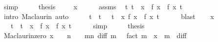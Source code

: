 \begin{isabellebody}
\ simp\isanewline
\ \ \isamarkupfalse%
\ \isamarkupfalse%
\ {\isacharquery}{\kern0pt}thesis\ \isacommand{{\isachardot}{\kern0pt}{\isachardot}{\kern0pt}}\isamarkupfalse%
\isanewline
{}\isamarkupfalse%
\isanewline
\ \ \isamarkupfalse%
\ {\isachardoublequoteopen}x\ {\isachargreater}{\kern0pt}\ {}{\isachardoublequoteclose}\isanewline
\ \ \isamarkupfalse%
\ assms\ \isamarkupfalse%
\ {\isachardoublequoteopen}{\isasymexists}t{\isachargreater}{\kern0pt}{}{\isachardot}{\kern0pt}\ t\ {\isacharless}{\kern0pt}\ x\ {\isasymand}\ f\ x\ {\isacharequal}{\kern0pt}\ {\isacharquery}{\kern0pt}f\ x\ t{\isachardoublequoteclose}\isanewline
\ \ \ \ \isamarkupfalse%
\ {\isacharparenleft}{\kern0pt}intro\ Maclaurin{\isacharparenright}{\kern0pt}\ auto\isanewline
\ \ \isamarkupfalse%
\ \isamarkupfalse%
\ t\ \ {\isachardoublequoteopen}t\ {\isachargreater}{\kern0pt}\ {}{\isachardoublequoteclose}\ {\isachardoublequoteopen}t\ {\isacharless}{\kern0pt}\ x{\isachardoublequoteclose}\ {\isachardoublequoteopen}f\ x\ {\isacharequal}{\kern0pt}\ {\isacharquery}{\kern0pt}f\ x\ t{\isachardoublequoteclose}\isanewline
\ \ \ \ \isamarkupfalse%
\ blast\isanewline
\ \ \isamarkupfalse%
\ {\isacartoucheopen}x\ {\isachargreater}{\kern0pt}\ {}{\isacartoucheclose}\ \isamarkupfalse%
\ {\isachardoublequoteopen}{}\ {\isacharless}{\kern0pt}\ {\isasymbar}t{\isasymbar}\ {\isasymand}\ {\isasymbar}t{\isasymbar}\ {\isacharless}{\kern0pt}\ {\isasymbar}x{\isasymbar}\ {\isasymand}\ f\ x\ {\isacharequal}{\kern0pt}\ {\isacharquery}{\kern0pt}f\ x\ t{\isachardoublequoteclose}\isanewline
\ \ \ \ \isamarkupfalse%
\ simp\isanewline
\ \ \isamarkupfalse%
\ \isamarkupfalse%
\ {\isacharquery}{\kern0pt}thesis\ \isacommand{{\isachardot}{\kern0pt}{\isachardot}{\kern0pt}}\isamarkupfalse%
\isanewline
{}\isamarkupfalse%
%
\endisatagproof
{\isafoldproof}%
%
\isadelimproof
\isanewline
%
\endisadelimproof
\isanewline
{}\isamarkupfalse%
\ Maclaurin{\isacharunderscore}{\kern0pt}zero{\isacharcolon}{\kern0pt}\ {\isachardoublequoteopen}x\ {\isacharequal}{\kern0pt}\ {}\ {\isasymLongrightarrow}\ n\ {\isasymnoteq}\ {}\ {\isasymLongrightarrow}\ {\isacharparenleft}{\kern0pt}{\isasymSum}m{\isacharless}{\kern0pt}n{\isachardot}{\kern0pt}\ {\isacharparenleft}{\kern0pt}diff\ m\ {}\ {\isacharslash}{\kern0pt}\ fact\ m{\isacharparenright}{\kern0pt}\ {\isacharasterisk}{\kern0pt}\ x\ {\isacharcircum}{\kern0pt}\ m{\isacharparenright}{\kern0pt}\ {\isacharequal}{\kern0pt}\ diff\ {}\ {}{\isachardoublequoteclose}\isanewline

\end{isabellebody}
